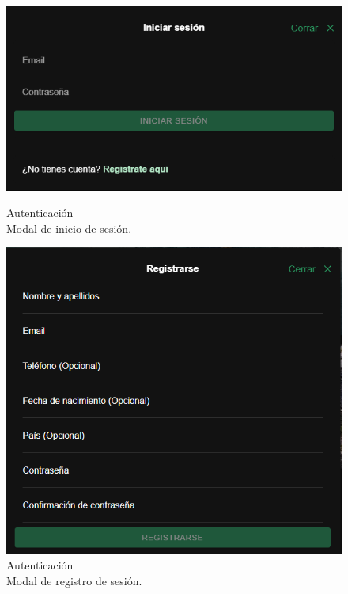 \begin{figure}[H]
	\centering
	\begin{minipage}{0.45\textwidth}
		\centering
		\includegraphics[width=1\textwidth]{7-Construccion/Manuales/web/modal inicio.png}
		\caption{Autenticación \\ Modal de inicio de sesión.}
		\label{fig:inicio-form}
	\end{minipage}
	\hfill
	\begin{minipage}{0.45\textwidth}
		\centering
		\includegraphics[width=1\textwidth]{7-Construccion/Manuales/web/modal registro.png}
		\caption{Autenticación \\ Modal de registro de sesión.}
		\label{fig:registro-form}
	\end{minipage}
\end{figure}


